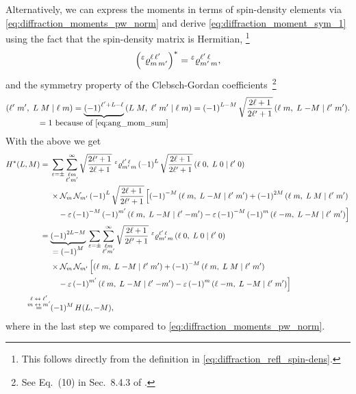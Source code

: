 Alternatively, we can express the moments in terms of spin-density
elements via \cref{eq:diffraction_moments_pw_norm} and derive
\cref{eq:diffraction_moment_sym_1} using the fact that the
spin-density matrix is Hermitian, \ie\footnote{This follows directly
from the definition in \cref{eq:diffraction_refl_spin-dens}.}
\begin{equation}
  \rBrk{\prescript{\refl}{}{\varrho}^{\ell\, \ell'}_{m\, m'}}^*
  = \prescript{\refl}{}{\varrho}^{\ell'\, \ell}_{m'\, m},
\end{equation}
and the symmetry property of the Clebsch-Gordan coefficients\, \ie
\footnote{See Eq.~(10) in Sec.~8.4.3 of
.}
\begin{equation}
  \label{eq:clebsch_sym}
  \clebsch{\ell'}{m'}{L}{M}{\ell}{m}
  = \cdUnderbrace{{(-1)}^{\ell' + L - \ell}}{= 1~\text{because of \cref{eq:ang_mom_sum}}}\, \clebsch{L}{M}{\ell'}{m'}{\ell}{m}
  = {(-1)}^{L - M}\, \sqrt{\frac{2 \ell + 1}{2 \ell' + 1}}\, \clebsch{\ell}{m}{L}{-M}{\ell'}{m'}.
\end{equation}
With the above we get
\begin{align}
  H^*(L, M)
  ={}& \begin{multlined}[t][0.8\textwidth]
    \sum_{\refl = \pm} \sum_{\substack{\ell m \\ \ell' m'}}^\infty
    \sqrt{\frac{2 \ell' + 1}{2 \ell + 1}}\,
    \prescript{\refl}{}{\varrho}^{\ell'\, \ell}_{m'\, m}\,
    {(-1)}^L\, \sqrt{\frac{2 \ell + 1}{2 \ell' + 1}}\, \clebsch{\ell}{0}{L}{0}{\ell'}{0} \\
    \shoveleft{\times \mathcal{N}_m\, \mathcal{N}_{m'}\,
    {(-1)}^L\, \sqrt{\frac{2 \ell + 1}{2 \ell' + 1}}\, \Big[
      {(-1)}^{-M}\, \clebsch{\ell}{m}{L}{-M}{\ell'}{m'}
      + {(-1)}^{2M}\, \clebsch{\ell}{m}{L}{M}{\ell'}{m'}} \\
      - \refl\, {(-1)}^{-M}\, {(-1)}^{m'}\, \clebsch{\ell}{m}{L}{-M}{\ell'}{-m'}
      - \refl\, {(-1)}^{-M}\, {(-1)}^m\, \clebsch{\ell}{-m}{L}{-M}{\ell'}{m'} \Big]
  \end{multlined} \notag
  \\
  ={}& \begin{multlined}[t][0.8\textwidth]
    \dUnderbrace{{(-1)}^{2 L - M}}{= {(-1)}^M}\, \sum_{\refl = \pm} \sum_{\substack{\ell m \\ \ell' m'}}^\infty
    \sqrt{\frac{2 \ell + 1}{2 \ell' + 1}}\,
    \prescript{\refl}{}{\varrho}^{\ell'\, \ell}_{m'\, m}\, \clebsch{\ell}{0}{L}{0}{\ell'}{0} \\
    \shoveleft{\times \mathcal{N}_m\, \mathcal{N}_{m'}\, \Big[
      \clebsch{\ell}{m}{L}{-M}{\ell'}{m'}
      + {(-1)}^{-M}\, \clebsch{\ell}{m}{L}{M}{\ell'}{m'}} \\
      - \refl\, {(-1)}^{m'}\, \clebsch{\ell}{m}{L}{-M}{\ell'}{-m'}
      - \refl\, {(-1)}^m\, \clebsch{\ell}{-m}{L}{-M}{\ell'}{m'} \Big]
  \end{multlined} \notag
  \\
  \equalUsing{$\substack{\displaystyle{\ell \leftrightarrow \ell'} \\ \displaystyle{m \leftrightarrow m'}}$}&
  (-1)^M\, H(L, -M),
\end{align}
where in the last step we compared to
\cref{eq:diffraction_moments_pw_norm}.

